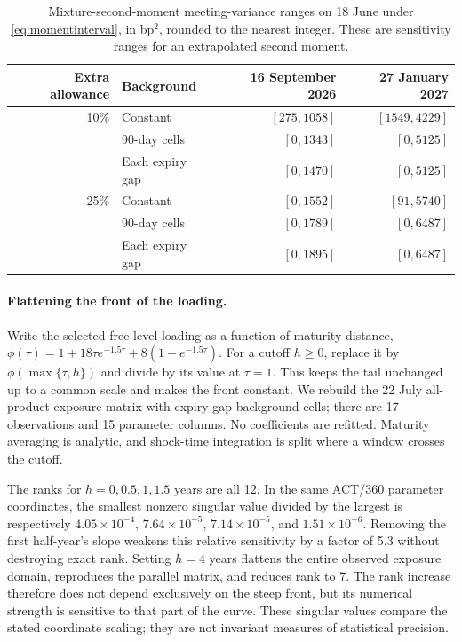 \begin{table}[ht]
\centering\small
\begin{tabular}{rlrr}
\toprule
Extra allowance & Background & 16 September 2026 & 27 January 2027\\
\midrule
10\% & Constant & $[275,1058]$ & $[1549,4229]$\\
 & 90-day cells & $[0,1343]$ & $[0,5125]$\\
 & Each expiry gap & $[0,1470]$ & $[0,5125]$\\
25\% & Constant & $[0,1552]$ & $[91,5740]$\\
 & 90-day cells & $[0,1789]$ & $[0,6487]$\\
 & Each expiry gap & $[0,1895]$ & $[0,6487]$\\
\bottomrule
\end{tabular}
\caption{Mixture-second-moment meeting-variance ranges on 18 June under \eqref{eq:momentinterval}, in bp$^2$, rounded to the nearest integer. These are sensitivity ranges for an extrapolated second moment.}\label{tab:momentcheck}
\end{table}

\paragraph{Flattening the front of the loading.}
Write the selected free-level loading as a function of maturity distance,
$\phi(\tau)=1+18\tau e^{-1.5\tau}+8(1-e^{-1.5\tau})$.
For a cutoff $h\geq0$, replace it by $\phi(\max\{\tau,h\})$ and divide by its value at $\tau=1$. This keeps the tail unchanged up to a common scale and makes the front constant. We rebuild the 22 July all-product exposure matrix with expiry-gap background cells; there are 17 observations and 15 parameter columns. No coefficients are refitted. Maturity averaging is analytic, and shock-time integration is split where a window crosses the cutoff.

The ranks for $h=0,0.5,1,1.5$ years are all 12. In the same ACT/360 parameter coordinates, the smallest nonzero singular value divided by the largest is respectively $4.05\times10^{-4}$, $7.64\times10^{-5}$, $7.14\times10^{-5}$, and $1.51\times10^{-6}$. Removing the first half-year's slope weakens this relative sensitivity by a factor of 5.3 without destroying exact rank. Setting $h=4$ years flattens the entire observed exposure domain, reproduces the parallel matrix, and reduces rank to 7. The rank increase therefore does not depend exclusively on the steep front, but its numerical strength is sensitive to that part of the curve. These singular values compare the stated coordinate scaling; they are not invariant measures of statistical precision.\FloatBarrier
